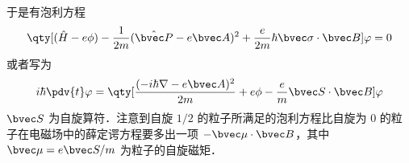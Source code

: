 于是有泡利方程
\begin{equation}
\qty[(\hat H-e\phi)-\frac{1}{2m}(\hat{\bvec P}-e\bvec A)^2+\frac{e}{2m}\hbar\bvec \sigma\cdot \bvec B]\varphi=0
\end{equation}
或者写为
\begin{equation}
i\hbar\pdv{t} \varphi = \qty[\frac{(-i\hbar\nabla - e\bvec A)^2}{2m}+e\phi-\frac{e}{m}\bvec S\cdot \bvec B]\varphi
\end{equation}
$\bvec S$ 为自旋算符．注意到自旋 $1/2$ 的粒子所满足的泡利方程比自旋为 $0$ 的粒子在电磁场中的薛定谔方程要多出一项 $-\bvec \mu\cdot \bvec B$，其中 $\bvec \mu=e\bvec S/m$ 为粒子的自旋磁矩．